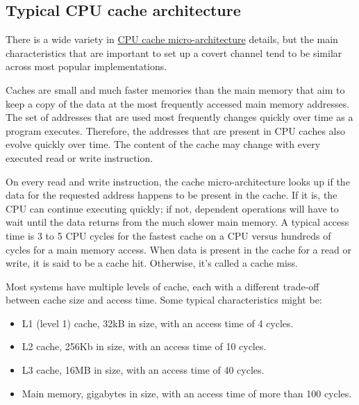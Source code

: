 \documentclass[a4paper,]{report}
\providecommand{\tightlist}{%
  \setlength{\itemsep}{0pt}\setlength{\parskip}{0pt}}
\begin{document}
\hypertarget{typical-cpu-cache-architecture}{%
\subsection{Typical CPU cache
architecture}\label{typical-cpu-cache-architecture}}

There is a wide variety in
\href{https://en.wikipedia.org/wiki/CPU_cache}{CPU cache
micro-architecture} details, but the main characteristics that are
important to set up a covert channel tend to be similar across most
popular implementations.

Caches are small and much faster memories than the main memory that aim
to keep a copy of the data at the most frequently accessed main memory
addresses. The set of addresses that are used most frequently changes
quickly over time as a program executes. Therefore, the addresses that
are present in CPU caches also evolve quickly over time. The content of
the cache may change with every executed read or write instruction.

On every read and write instruction, the cache micro-architecture looks
up if the data for the requested address happens to be present in the
cache. If it is, the CPU can continue executing quickly; if not,
dependent operations will have to wait until the data returns from the
much slower main memory. A typical access time is 3 to 5 CPU cycles for
the fastest cache on a CPU versus hundreds of cycles for a main memory
access. When data is present in the cache for
a read or write, it is said to be a cache hit.
Otherwise, it's called a cache miss.

Most systems have multiple levels of cache,
each with a different trade-off between cache size and
access time. Some typical characteristics might
be:

\begin{itemize}
\tightlist
\item
  L1 (level 1) cache, 32kB in size, with an access time of 4 cycles.
\item
  L2 cache, 256Kb in size, with an access time of 10 cycles.
\item
  L3 cache, 16MB in size, with an access time of 40 cycles.
\item
  Main memory, gigabytes in size, with an access time of more than 100
  cycles.
\end{itemize}
\end{document}
